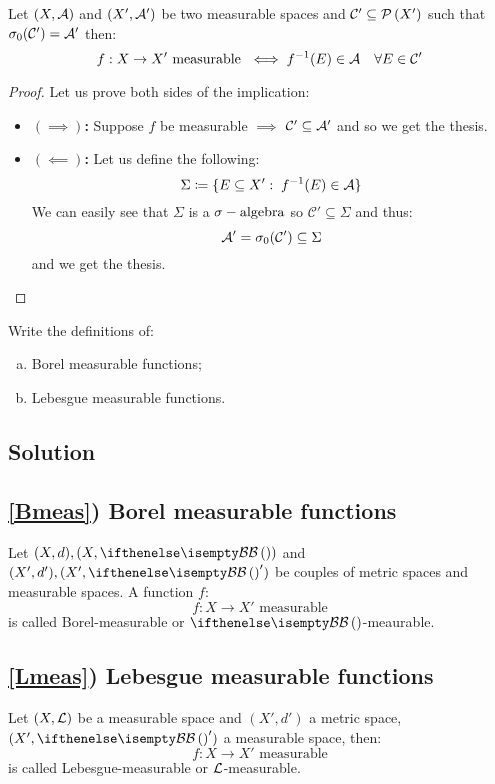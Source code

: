 Let $(X,\mathcal{A})$ and $(X',\mathcal{A}')$ be two measurable spaces and $\mathcal{C} ' \subseteq \mathcal{P}\left(X'\right)$ such that $\sigma_0(\mathcal{C}')=\mathcal{A}'$ then:
\[
    f:X\to X' \text{ measurable } \iff f^{-1}(E)\in\mathcal{A} \quad \forall E\in\mathcal{C}'
\]

\begin{proof}
    Let us prove both sides of the implication:
    \begin{itemize}
        \item \textbf{$(\implies)$:} Suppose $f$ be measurable $\implies$ $\mathcal{C}'\subseteq \mathcal{A}'$ and so we get the thesis.
        \item \textbf{$(\impliedby)$:} Let us define the following:
              \[
                  \Sigma \coloneqq \{ E\subseteq X': \; f^{-1}(E)\in\mathcal{A} \}
              \]
              We can easily see that $\Sigma$ is a $\sigma-\text{algebra}$ so $\mathcal{C}'\subseteq \Sigma$ and thus:
              \[
                  \mathcal{A}'=\sigma_0(\mathcal{C}')\subseteq\Sigma
              \]
              and we get the thesis.
    \end{itemize}
\end{proof}


\question

Write the definitions of:
\begin{enumerate}[a)]
    \item \label{Bmeas} Borel measurable functions;
    \item \label{Lmeas} Lebesgue measurable functions.
\end{enumerate}

\subsection*{Solution}

\subsection{\ref{Bmeas}) Borel measurable functions}
Let $(X,d), (X,\B)$ and $(X',d'), (X', \B')$ be couples of metric spaces and measurable spaces. A function $f$:
\[
    f:X\to X' \text{ measurable}
\]
is called Borel-measurable or $\B$-meaurable.

\subsection{\ref{Lmeas}) Lebesgue measurable functions}
Let $(X,\mathcal{L})$ be a measurable space and $(X',d')$ a metric space, $(X',\B')$ a measurable space, then:
\[
    f:X\to X' \text{ measurable}
\]
is called Lebesgue-measurable or $\mathcal{L}$-measurable.

